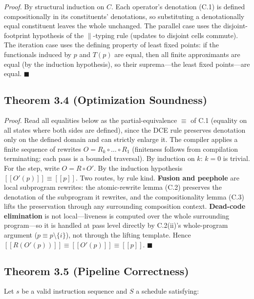 \documentclass[
  11pt,
]{article}
\newcommand{\llbracket}{[\![}
\newcommand{\rrbracket}{]\!]}
\begin{document}
\emph{Proof.} By structural induction on \(C\). Each operator's
denotation (C.1) is defined compositionally in its constituents'
denotations, so substituting a denotationally equal constituent leaves
the whole unchanged. The parallel case uses the disjoint-footprint
hypothesis of the \(\parallel\)-typing rule (updates to disjoint cells
commute). The iteration case uses the defining property of least fixed
points: if the functionals induced by \(p\) and \(T(p)\) are equal, then
all finite approximants are equal (by the induction hypothesis), so
their suprema---the least fixed points---are equal. \(\blacksquare\)

\subsection{Theorem 3.4 (Optimization
Soundness)}\label{theorem-3.4-optimization-soundness}

\emph{Proof.} Read all equalities below as the partial-equivalence
\(\equiv\) of C.1 (equality on all states where both sides are defined),
since the DCE rule preserves denotation only on the defined domain and
can strictly enlarge it. The compiler applies a finite sequence of
rewrites \(O = R_k \circ \dots \circ R_1\) (finiteness follows from
compilation terminating; each pass is a bounded traversal). By induction
on \(k\): \(k = 0\) is trivial. For the step, write \(O = R \circ O'\).
By the induction hypothesis
\(\llbracket O'(p) \rrbracket \equiv \llbracket p \rrbracket\). Two
routes, by rule kind. \textbf{Fusion and peephole} are local subprogram
rewrites: the atomic-rewrite lemma (C.2) preserves the denotation of the
subprogram it rewrites, and the compositionality lemma (C.3) lifts the
preservation through any surrounding composition context.
\textbf{Dead-code elimination} is not local---liveness is computed over
the whole surrounding program---so it is handled at pass level directly
by C.2(ii)'s whole-program argument (\(p \equiv p \setminus \{i\}\)),
not through the lifting template. Hence
\(\llbracket R(O'(p)) \rrbracket \equiv \llbracket O'(p) \rrbracket \equiv \llbracket p \rrbracket\).
\(\blacksquare\)

\subsection{Theorem 3.5 (Pipeline
Correctness)}\label{theorem-3.5-pipeline-correctness}

Let \(s\) be a valid instruction sequence and \(S\) a schedule
satisfying:
\end{document}
